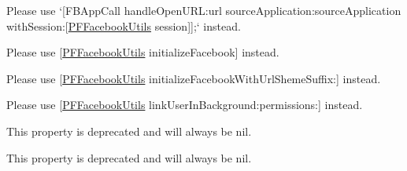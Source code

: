 
\begin{DoxyRefList}
\item[\label{deprecated__deprecated000009}%
\hypertarget{deprecated__deprecated000009}{}%
Member \hyperlink{interface_p_f_facebook_utils_adbc30b3397cc07f57110eb843e79918e}{\mbox{[}P\+F\+Facebook\+Utils handle\+Open\+U\+R\+L\+:\mbox{]}} ]Please use `\mbox{[}F\+B\+App\+Call handle\+Open\+U\+R\+L\+:url source\+Application\+:source\+Application with\+Session\+:\mbox{[}\hyperlink{interface_p_f_facebook_utils}{P\+F\+Facebook\+Utils} session\mbox{]}\mbox{]};` instead.  
\item[\label{deprecated__deprecated000006}%
\hypertarget{deprecated__deprecated000006}{}%
Member \hyperlink{interface_p_f_facebook_utils_a7e76ed1e5b7b1835ce142cab99bf013e}{\mbox{[}P\+F\+Facebook\+Utils initialize\+With\+Application\+Id\+:\mbox{]}} ]Please use {\ttfamily \mbox{[}\hyperlink{interface_p_f_facebook_utils}{P\+F\+Facebook\+Utils} initialize\+Facebook\mbox{]}} instead.  
\item[\label{deprecated__deprecated000007}%
\hypertarget{deprecated__deprecated000007}{}%
Member \hyperlink{interface_p_f_facebook_utils_a68a546a99724df3fb5b123cd30d5e996}{\mbox{[}P\+F\+Facebook\+Utils initialize\+With\+Application\+Id\+:url\+Scheme\+Suffix\+:\mbox{]}} ]Please use {\ttfamily \mbox{[}\hyperlink{interface_p_f_facebook_utils}{P\+F\+Facebook\+Utils} initialize\+Facebook\+With\+Url\+Sheme\+Suffix\+:\mbox{]}} instead.  
\item[\label{deprecated__deprecated000008}%
\hypertarget{deprecated__deprecated000008}{}%
Member \hyperlink{interface_p_f_facebook_utils_af6ad4b0eaccdeedc9742c7f5c7fa668b}{\mbox{[}P\+F\+Facebook\+Utils link\+User\+:permissions\+:\mbox{]}} ]Please use {\ttfamily \mbox{[}\hyperlink{interface_p_f_facebook_utils}{P\+F\+Facebook\+Utils} link\+User\+In\+Background\+:permissions\+:\mbox{]}} instead.  
\item[\label{deprecated__deprecated000010}%
\hypertarget{deprecated__deprecated000010}{}%
Member \hyperlink{interface_p_f_log_in_view_afff2ef2f219c539b4a810564faa5a1ed}{\mbox{[}P\+F\+Log\+In\+View \+\_\+\+\_\+attribute\+\_\+\+\_\+\mbox{]}} ]This property is deprecated and will always be nil. 

This property is deprecated and will always be nil. 


\end{DoxyRefList}
